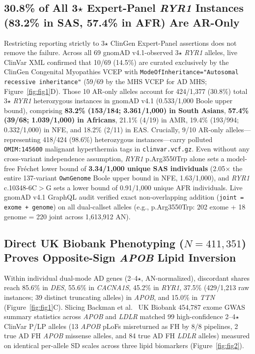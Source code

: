 \documentclass[11pt,letterpaper]{article}
\begin{document}
\subsection{30.8\% of All 3$\star$ Expert-Panel \textit{RYR1} Instances (83.2\% in SAS, 57.4\% in AFR) Are AR-Only}
Restricting reporting strictly to 3$\star$ ClinGen Expert-Panel assertions does not remove the failure. Across all 69 gnomAD v4.1-observed 3$\star$ \textit{RYR1} alleles, live ClinVar XML confirmed that 10/69 (14.5\%) are curated exclusively by the ClinGen Congenital Myopathies VCEP with \texttt{ModeOfInheritance="Autosomal recessive inheritance"} (59/69 by the MHS VCEP for AD MHS; Figure~\ref{fig:fig1}D). Those 10 AR-only alleles account for 424/1,377 (30.8\%) total 3$\star$ \textit{RYR1} heterozygous instances in gnomAD v4.1 (0.533/1,000 Boole upper bound), comprising \textbf{83.2\% (153/184; 3.361/1,000) in South Asians}, \textbf{57.4\% (39/68; 1.039/1,000) in Africans}, 21.1\% (4/19) in AMR, 19.4\% (193/994; 0.332/1,000) in NFE, and 18.2\% (2/11) in EAS. Crucially, 9/10 AR-only alleles---representing 418/424 (98.6\%) heterozygous instances---carry polluted \texttt{OMIM:145600} malignant hyperthermia tags in \texttt{clinvar.vcf.gz}. Even without any cross-variant independence assumption, \textit{RYR1} p.Arg3550Trp alone sets a model-free Fr\'{e}chet lower bound of \textbf{3.34/1,000 unique SAS individuals} (2.05$\times$ the entire 137-variant \texttt{OwnGenome} Boole upper bound in NFE, 1.63/1,000), and \textit{RYR1} c.10348-6C$>$G sets a lower bound of 0.91/1,000 unique AFR individuals. Live gnomAD v4.1 GraphQL audit verified exact non-overlapping addition (\texttt{joint = exome + genome}) on all dual-callset alleles (e.g., p.Arg3550Trp: 202 exome + 18 genome = 220 joint across 1,613,912 AN).

\subsection{Direct UK Biobank Phenotyping ($N=411{,}351$) Proves Opposite-Sign \textit{APOB} Lipid Inversion}
Within individual dual-mode AD genes (2--4$\star$, AN-normalized), discordant shares reach 85.6\% in \textit{DES}, 55.6\% in \textit{CACNA1S}, 45.2\% in \textit{RYR1}, 37.5\% (429/1,213 raw instances; 39 distinct truncating alleles) in \textit{APOB}, and 15.0\% in \textit{TTN} (Figure~\ref{fig:fig1}C). Slicing Backman et al.~\citep{backman2021ukbexome} UK Biobank 454,787 exome GWAS summary statistics across \textit{APOB} and \textit{LDLR} matched 99 high-confidence 2--4$\star$ ClinVar P/LP alleles (13 \textit{APOB} pLoFs misreturned as FH by 8/8 pipelines, 2 true AD FH \textit{APOB} missense alleles, and 84 true AD FH \textit{LDLR} alleles) measured on identical per-allele SD scales across three lipid biomarkers (Figure~\ref{fig:fig2}).
\end{document}

